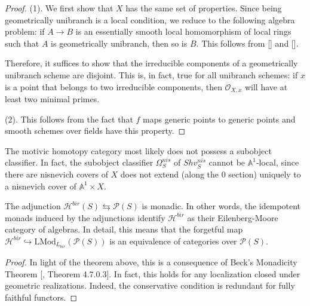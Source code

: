 \begin{proof}
(1). We first show that $X$ has the same set of properties. Since being geometrically unibranch is a local condition, we reduce to the following algebra problem: if $A\to B$ is an essentially smooth local homomorphism of local rings such that $A$ is geometrically unibranch, then so is $B$. This follows from [\cite[\href{https://stacks.math.columbia.edu/tag/0DQ1}{Lemma 0DQ1 (1)}]{stacks-project}] and [\cite[\href{https://stacks.math.columbia.edu/tag/0C37}{Lemma 0C37 (3)}]{stacks-project}]. 

Therefore, it suffices to show that the irreducible components of a geometrically unibranch scheme are disjoint. This is, in fact, true for all unibranch schemes: if $x$ is a point that belongs to two irreducible components, then $\mathcal{O}_{X,x}$ will have at least two minimal primes.

(2). This follows from the fact that $f$ maps generic points to generic points and smooth schemes over fields have this property.
\end{proof}
\begin{rem}
    The motivic homotopy category most likely does not possess a subobject classifier. In fact, the subobject classifier $\Omega^{nis} _S$ of $Shv_S^{nis}$ cannot be $\mathbb{A}^1$-local, since there are nisnevich covers of $X$ does not extend (along the $0$ section) uniquely to a nisnevich cover of $\mathbb{A}^1\times X$.
\end{rem}

\begin{thm}
    The adjunction $\mathcal{H}^{bir}(S)\leftrightarrows \mathcal{P}(S)$ is monadic. In other words, the idempotent monads induced by the adjunctions identify $\mathcal{H}^{bir}$ as their Eilenberg-Moore category of algebras. In detail, this means that the forgetful map $\mathcal{H}^{bir}\hookrightarrow \text{LMod}_{L_{bir}}(\mathcal{P}
    {(S)})$ is an equivalence of categories over $\mathcal{P}(S)$.
\end{thm}
\begin{proof}
    In light of the theorem above, this is a consequence of Beck's Monadicity Theorem [\cite{lurie2017higher}, Theorem 4.7.0.3]. In fact, this holds for any localization closed under geometric realizations. Indeed, the conservative condition is redundant for fully faithful functors. 
\end{proof}

